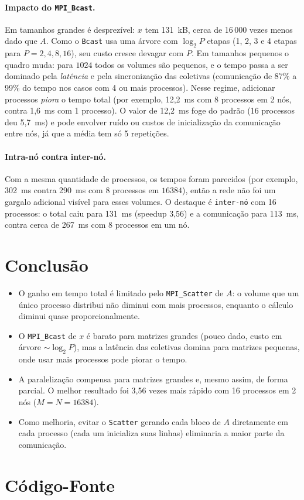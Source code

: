 \documentclass[a4paper,12pt]{article}
\begin{document}
\paragraph{Impacto do \texttt{MPI\_Bcast}.} Em tamanhos grandes é desprezível: $x$ tem 131~kB, cerca de 16\,000 vezes menos dado que $A$. Como o \texttt{Bcast} usa uma árvore com $\log_2 P$ etapas (1, 2, 3 e 4 etapas para $P=2,4,8,16$), seu custo cresce devagar com $P$. Em tamanhos pequenos o quadro muda: para $1024$ todos os volumes são pequenos, e o tempo passa a ser dominado pela \emph{latência} e pela sincronização das coletivas (comunicação de 87\% a 99\% do tempo nos casos com 4 ou mais processos). Nesse regime, adicionar processos \emph{piora} o tempo total (por exemplo, 12,2~ms com 8 processos em 2 nós, contra 1,6~ms com 1 processo). O valor de 12,2~ms foge do padrão (16 processos deu 5,7~ms) e pode envolver ruído ou custos de inicialização da comunicação entre nós, já que a média tem só 5 repetições.

\paragraph{Intra-nó contra inter-nó.} Com a mesma quantidade de processos, os tempos foram parecidos (por exemplo, 302~ms contra 290~ms com 8 processos em $16384$), então a rede não foi um gargalo adicional visível para esses volumes. O destaque é \texttt{inter-nó} com 16 processos: o total caiu para 131~ms (speedup 3,56) e a comunicação para 113~ms, contra cerca de 267~ms com 8 processos em um nó.

\section{Conclusão}

\begin{itemize}
    \item O ganho em tempo total é limitado pelo \texttt{MPI\_Scatter} de $A$: o volume que um único processo distribui não diminui com mais processos, enquanto o cálculo diminui quase proporcionalmente.
    \item O \texttt{MPI\_Bcast} de $x$ é barato para matrizes grandes (pouco dado, custo em árvore $\sim\log_2 P$), mas a latência das coletivas domina para matrizes pequenas, onde usar mais processos pode piorar o tempo.
    \item A paralelização compensa para matrizes grandes e, mesmo assim, de forma parcial. O melhor resultado foi 3,56 vezes mais rápido com 16 processos em 2 nós ($M=N=16384$).
    \item Como melhoria, evitar o \texttt{Scatter} gerando cada bloco de $A$ diretamente em cada processo (cada um inicializa suas linhas) eliminaria a maior parte da comunicação.
\end{itemize}

\newpage
\appendix

\section{Código-Fonte}


\end{document}
